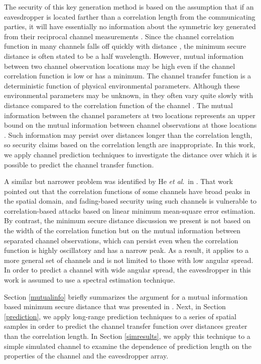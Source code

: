 \documentclass{allertonproc}
\begin{document}
The security of this key generation method is based on the assumption that if an eavesdropper is located farther than a correlation length from the communicating parties, it will have essentially no information about the symmetric key generated from their reciprocal channel measurements \cite{azimisadjadi2007, bloch2008, mathur2008, ye2010, he2013}.  Since the channel correlation function in many channels falls off quickly with distance \cite{jakes1974}, the minimum secure distance is often stated to be a half wavelength.  However, mutual information between two channel observation locations may be high even if the channel correlation function is low or has a minimum.  The channel transfer function is a deterministic function of physical environmental parameters.  Although these environmental parameters may be unknown, in they often vary quite slowly with distance compared to the correlation function of the channel \cite{jakes1974, duel-hallen2007}.  The mutual information between the channel parameters at two locations represents an upper bound on the mutual information between channel observations at those locations \cite{kckpVTC2015}.  Such information may persist over distances longer than the correlation length, so security claims based on the correlation length are inappropriate.  In this work, we apply channel prediction techniques \cite{duel-hallen2007} to investigate the distance over which it is possible to predict the channel transfer function.

A similar but narrower problem was identified by He \emph{et al}.~in \cite{he2013}.  That work pointed out that the correlation functions of some channels have broad peaks in the spatial domain, and fading-based security using such channels is vulnerable to correlation-based attacks based on linear minimum mean-square error estimation.  By contrast, the minimum secure distance discussion we present is not based on the width of the correlation function but on the mutual information between separated channel observations, which can persist even when the correlation function is highly oscillatory and has a narrow peak.  As a result, it applies to a more general set of channels and is not limited to those with low angular spread.  In order to predict a channel with wide angular spread, the eavesdropper in this work is assumed to use a spectral estimation technique.

Section \ref{mutualinfo} briefly summarizes the argument for a mutual information based minimum secure distance that was presented in \cite{kckpVTC2015}.  Next, in Section \ref{prediction}, we apply long-range prediction techniques to a series of spatial samples in order to predict the channel transfer function over distances greater than the correlation length.  In Section \ref{simresults}, we apply this technique to a simple simulated channel to examine the dependence of prediction length on the properties of the channel and the eavesdropper array. 
\end{document}
